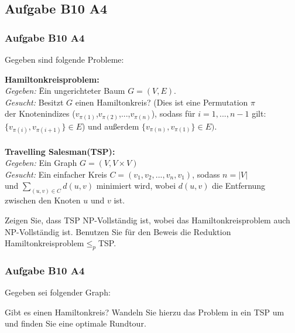 \subsection{Aufgabe B10 A4}
\begin{frame}
	\frametitle{Aufgabe B10 A4}
 Gegeben sind folgende Probleme: 
 \begin{tabbing}
 \textbf{Hamiltonkreisproblem:} \\
 \hspace{10pt} \= \textit{Gegeben:} \= Ein ungerichteter Baum $G=(V,E)$.\\
 \> \textit{Gesucht:} \> Besitzt $G$ einen Hamiltonkreis? (Dies ist eine Permutation $\pi$\\
 \> der Knotenindizes ($v_{\pi(1)}$,$v_{\pi(2)}$,...,$v_{\pi(n)}$), sodass für $i=1,...,n-1$ gilt:\\
 \> $\{v_{\pi(i)},v_{\pi(i+1)}\}\in E$) und außerdem $\{v_{\pi(n)},v_{\pi(1)}\} \in E)$.\\ \\
 \textbf{Travelling Salesman(TSP):}\\
 \> \textit{Gegeben:} Ein Graph $G=(V,V \times V)$\\
 \> \textit{Gesucht:} \> Ein einfacher Kreis $C=(v_1,v_2,...,v_n,v_1)$, sodass $n=|V|$\\ 
 \> und $\sum_{(u,v)\in C} d(u,v)$ minimiert wird, wobei $d(u,v)$ die Entfernung\\ 
 \>zwischen den Knoten $u$ und $v$ ist.\\
\end{tabbing}
Zeigen Sie, dass TSP NP-Vollständig ist, wobei das Hamiltonkreisproblem auch NP-Vollständig ist. Benutzen Sie für den Beweis die Reduktion Hamiltonkreisproblem$\leq_p$TSP. 
\end{frame}
\begin{frame}
	\frametitle{Aufgabe B10 A4}
Gegeben sei folgender Graph:\newline
\begin{center}
\end{center}
Gibt es einen Hamiltonkreis? Wandeln Sie hierzu das Problem in ein TSP um und finden Sie eine optimale Rundtour.
\end{frame}

